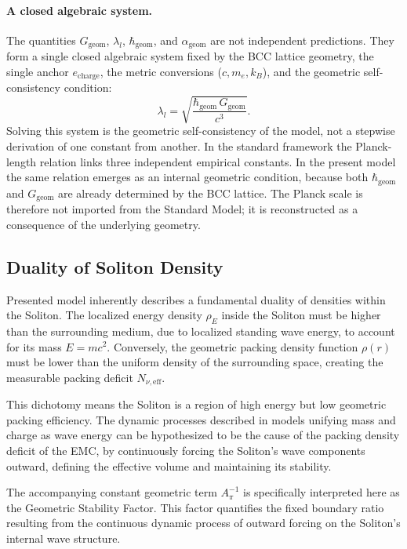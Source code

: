 \documentclass[10pt,a4paper]{article}
\begin{document}
\paragraph{A closed algebraic system.}
The quantities \(G_{\text{geom}}\), \(\lambda_l\), \(\hbar_{\text{geom}}\), and \(\alpha_{\text{geom}}\) are not independent predictions. They form a single closed algebraic system fixed by the BCC lattice geometry, the single anchor \(e_{\text{charge}}\), the metric conversions (\(c, m_e, k_B\)), and the geometric self-consistency condition:
\begin{equation}
	\lambda_l = \sqrt{\frac{\hbar_{\text{geom}}\,G_{\text{geom}}}{c^3}} .
\end{equation}
Solving this system is the geometric self-consistency of the model, not a stepwise derivation of one constant from another. In the standard framework the Planck-length relation links three independent empirical constants. In the present model the same relation emerges as an internal geometric condition, because both \(\hbar_{\text{geom}}\) and \(G_{\text{geom}}\) are already determined by the BCC lattice. The Planck scale is therefore not imported from the Standard Model; it is reconstructed as a consequence of the underlying geometry.

\subsection{Duality of Soliton Density}
\label{density_duality}

Presented model inherently describes a fundamental duality of densities within the Soliton. The localized energy density \(\rho_E\) inside the Soliton must be higher than the surrounding medium, due to localized standing wave energy, to account for its mass \(E=mc^2\). Conversely, the geometric packing density function \(\rho(r)\) must be lower than the uniform density of the surrounding space, creating the measurable packing deficit \(N_{\nu,\text{eff}}\).

This dichotomy means the Soliton is a region of high energy but low geometric packing efficiency. The dynamic processes described in models unifying mass and charge as wave energy \cite{yee2019geometry,yee2019masscharge, yee2021relativistic} can be hypothesized to be the cause of the packing density deficit of the EMC, by continuously forcing the Soliton's wave components outward, defining the effective volume and maintaining its stability.

The accompanying constant geometric term \(A_\pi^{-1}\) is specifically interpreted here as the Geometric Stability Factor. This factor quantifies the fixed boundary ratio resulting from the continuous dynamic process of outward forcing on the Soliton's internal wave structure.
\end{document}
